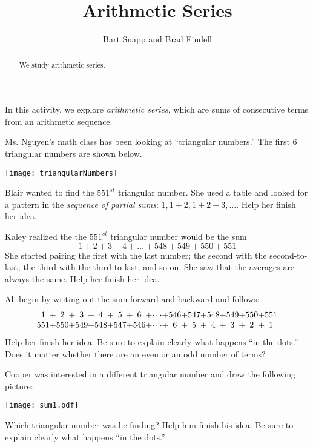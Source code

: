 \documentclass{ximera}
\title{Arithmetic Series}
\author{Bart Snapp and Brad Findell}
\begin{document}
\begin{abstract}
We study arithmetic series.
\end{abstract}
\maketitle

\label{A:arithmeticSeries}

In this activity, we explore \emph{arithmetic series}, which are sums of consecutive terms from an arithmetic sequence.

Ms. Nguyen's math class has been looking at ``triangular numbers.''  The first 6 triangular numbers are shown below. 
\begin{image}
\texttt{[image: triangularNumbers]}
\end{image}

\begin{problem}
Blair wanted to find the $551^{st}$ triangular number.  She used a table and looked for a pattern in the \emph{sequence of partial sums}:  $1, 1+2, 1+2+3, \dots$.  Help her finish her idea.  
\end{problem}

\begin{problem}
Kaley realized the the $551^{st}$ triangular number would be the sum 
\[
1+2+3+4+\dots+548+549+550+551
\]
She started pairing the first with the last number; the second with the second-to-last; the third with the third-to-last; and so on.  She saw that the averages are always the same.  Help her finish her idea.  
\end{problem}

\begin{problem}
Ali begin by writing out the sum forward and backward and follows:  
\[
\begin{array}{c@{ + }c@{ + }c@{ + }c@{ + }c@{ + }c@{ + }c@{ + }c@{ + }c@{ + }c@{ + }c@{ + }c@{ + }c}
1 & 2 & 3 & 4 & 5 & 6 & \cdots & 546 & 547 & 548 & 549 & 550 & 551 \\
551 & 550 & 549 & 548 & 547 & 546 & \cdots & 6 & 5 & 4 & 3 & 2 & 1 
\end{array}
\]
Help her finish her idea.  Be sure to explain clearly what happens ``in the dots.''  Does it matter whether there are an even or an odd number of terms?  
\end{problem}

\begin{problem}
Cooper was interested in a different triangular number and drew the following picture:   
\begin{image}
\texttt{[image: sum1.pdf]}
\end{image}
Which triangular number was he finding?  Help him finish his idea.  Be sure to explain clearly what 
happens ``in the dots.'' 
\end{problem}
\end{document}
